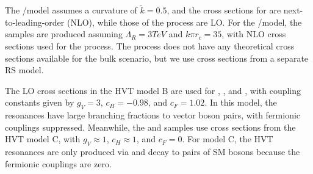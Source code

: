 The \ggF/\VBF\GBulktoWW model assumes a curvature of $\tilde{k}=0.5$, and the cross sections for \ggF\GBulktoWW are next-to-leading-order (NLO), while those of the \VBF process are LO.
For the \ggF/\VBF\RadtoWW model, the samples are produced assuming $\Lambda_{R}=3\unit{TeV}$ and $k\pi r_c=35$, with NLO cross sections used for the \ggF process.
The \VBF process does not have any theoretical cross sections available for the bulk scenario, but we use cross sections from a separate RS model.

The LO cross sections in the HVT model B are used for \DY\ZprtoWW, \DY\WprtoWZ, and \DY\WprtoWH, with coupling constants given by $g_V=3$, $c_H=-0.98$, and $c_F=1.02$.
In this model, the resonances have large branching fractions to vector boson pairs, with fermionic couplings suppressed.
Meanwhile, the \VBF\ZprtoWW and \DY\WprtoWZ samples use cross sections from the HVT model C, with $g_V\approx1$, $c_H\approx1$, and $c_F=0$.%
For model C, the HVT resonances are only produced via \VBF and decay to pairs of SM bosons because the fermionic couplings are zero.

